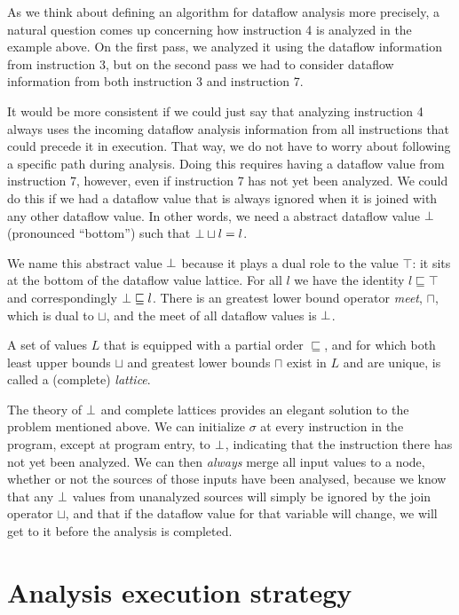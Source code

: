 \documentclass[11pt]{article}
\newcommand{\join}{\sqcup}
\newcommand{\meet}{\sqcap}
\newcommand{\alap}{\sqsubseteq}
\begin{document}
As we think about defining an algorithm for dataflow analysis more precisely, a
natural question comes up concerning how instruction 4 is analyzed in the
example above.  On the first pass, we analyzed it using the dataflow information
from instruction 3, but on the second pass we had to consider dataflow
information from both instruction 3 and instruction 7.

It would be more consistent if we could just say that analyzing instruction 4
always uses the incoming dataflow analysis information from all instructions
that could precede it in execution.  That way, we do not have to worry about
following a specific path during analysis.  Doing this requires having a
dataflow value from instruction 7, however, even if instruction 7 has not yet
been analyzed.  We could do this if we had a dataflow value that is always
ignored when it is joined with any other dataflow value.  In other words, we
need a abstract dataflow value $\bot$ (pronounced ``bottom'') such that
$\bottom \join l = l$.

We name this abstract value $\bot$ because it plays a dual role to the value
$\top$: it sits at the bottom of the dataflow value lattice.  For all $l$ we
have the identity $l \alap \top$ and correspondingly $\bottom \alap l$.  There
is an greatest lower bound operator \textit{meet}, $\meet$, which is dual to
$\join$, and the meet of all dataflow values is $\bot$.

A set of values $L$ that is equipped with a partial order $\alap$, and for which
both least upper bounds $\join$ and greatest lower bounds $\meet$ exist in $L$
and are unique, is called a (complete) \textit{lattice}.

The theory of $\bot$ and complete lattices provides an elegant solution to
the problem mentioned above.  We can initialize $\sigma$ at every instruction in
the program, except at program entry, to $\bot$, indicating that the
instruction there has not yet been analyzed.  We can then \emph{always} merge
all input values to a node, whether or not the sources of those inputs have been
analysed, because we know that any $\bot$ values from unanalyzed sources will
simply be ignored by the join operator $\join$, and that if the dataflow value
for that variable will change, we will get to it before the analysis is
completed.


\section{Analysis execution strategy}
\end{document}
